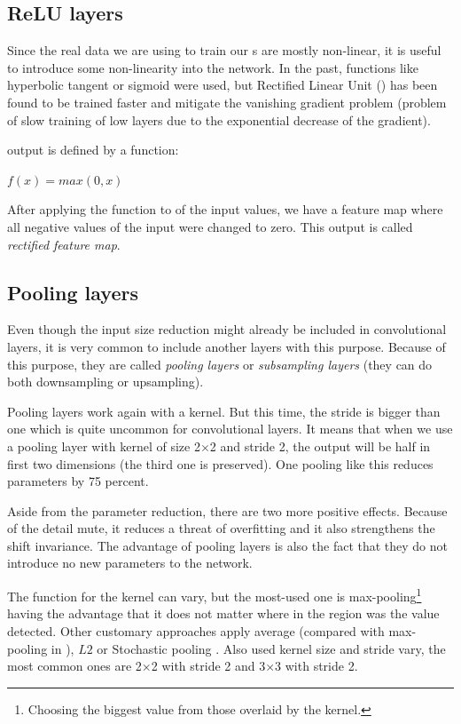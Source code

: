 \subsection{ReLU layers}
\label{relu-layers}

Since the real data we are using to train our s are mostly non-linear, 
it is useful to introduce some non-linearity into the network. In the past, 
functions like hyperbolic tangent or sigmoid were used, but Rectified Linear 
Unit () has been found to be trained faster and mitigate the vanishing 
gradient problem (problem of slow training of low layers due to the exponential 
decrease of the gradient). 

 output is defined by a function:

$f(x) = max(0, x)$

After applying the  function to of the input values, we have a feature 
map where all negative values of the input were changed to zero. This output is 
called \textit{rectified feature map}. 

\subsection{Pooling layers}
\label{pooling}

Even though the input size reduction might already be included in convolutional 
layers, it is very common to include another layers with this purpose. Because 
of this purpose, they are called \textit{pooling layers} or \textit{subsampling 
layers} (they can do both downsampling or upsampling). 

Pooling layers work again with a kernel. But this time, the stride is bigger 
than one which is quite uncommon for convolutional layers. It means that when we 
use a pooling layer with kernel of size 2$\times$2 and stride 2, the output will 
be half in first two dimensions (the third one is preserved). One pooling like 
this reduces parameters by 75 percent. 

Aside from the parameter reduction, there are two more positive effects. Because 
of the detail mute, it reduces a threat of overfitting and it also strengthens 
the shift invariance. The advantage of pooling layers is also the fact that they 
do not introduce no new parameters to the network. 

The function for the kernel can vary, but the most-used one is 
max-pooling\footnote{Choosing the biggest value from those overlaid by the 
kernel.} having the advantage that it does not matter where in the region was 
the value detected. Other customary approaches apply average (compared with 
max-pooling in \cite{avg-pooling}), $L2$ \cite{l2-pooling} or Stochastic pooling 
\cite{stoch-pooling}. Also used kernel size and stride vary, the most common 
ones are 2$\times$2 with stride 2 and 3$\times$3 with stride 2. 

